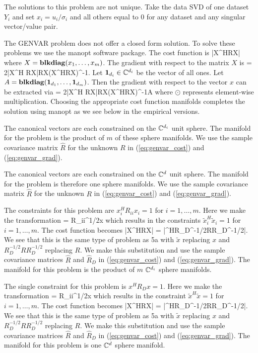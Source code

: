 The solutions to this problem are not unique. Take the data SVD of one dataset $Y_i$ and
set $x_i = u_i/\sigma_i$ and all others equal to 0 for any dataset and any singular
vector/value pair.


The GENVAR problem does not offer a closed form solution. To solve these problems we use
the manopt software package. The cost function is
\beq\label{eq:genvar_cost}
|X^HRX|
\eeq
where $X=\mathop{\bf blkdiag}(x_1,\dots,x_m)$. The gradient with respect to the matrix $X$ is
\be
{} = 2|X^H RX|RX(X^HRX)^{-1}.
\ee
Let $\mathbf 1_{d_i}\in\mathbb{C}^{d_i}$ be the vector of all ones. Let
$A=\mathop{\bf blkdiag}(\mathbf 1_{d_1},\dots,\mathbf 1_{d_m})$. Then the gradient with respect to the vector
$x$ can be extracted via
\beq\label{eq:genvar_grad}
 = 2|X^H RX|RX(X^HRX)^{-1}\odot A
\eeq
where $\odot$ represents element-wise multiplication. Choosing the appropriate cost
function manifolds completes the solution using manopt as we see below in the empirical
versions. 

The canonical vectors are each constrained on the $\mathbb{C}^{d_i}$ unit sphere. The
manifold for the problem is the product of $m$ of these sphere manifolds. We use the
sample covariance matrix $\widehat{R}$ for the unknown $R$ in (\ref{eq:genvar_cost}) and
(\ref{eq:genvar_grad}). 

The canonical vectors are each constrained on the $\mathbb{C}^{d}$ unit sphere. The
manifold for the problem is therefore one sphere manifolds. We use the
sample covariance matrix $\widehat{R}$ for the unknown $R$ in (\ref{eq:genvar_cost}) and
(\ref{eq:genvar_grad}). 

The constraints for this problem are $x_i^HR_{ii}x_i = 1$ for $i=1,\dots,m$. Here we make
the transformation
\be
{} = R_{ii}^{1/2}x
\ee
which results in the constraints $\widetilde{x}^H_i\widetilde{x}_i = 1$ for
$i=1,\dots,m$. The cost function becomes
\be
|X^HRX| = |^HR_D^{-1/2}RR_D^{-1/2}|.
\ee
We see that this is the same type of problem as 5a with $\widetilde{x}$ replacing $x$ and
$R_D^{-1/2}RR_D^{-1/2}$ replacing $R$. We make this substitution and use the sample
covariance matrices $\widehat{R}$ and $\widehat{R}_D$ in (\ref{eq:genvar_cost}) and
(\ref{eq:genvar_grad}). The manifold for this problem is the product of $m$
$\mathbb{C}^{d_i}$ sphere manifolds.

The single constraint for this problem is $x^HR_Dx = 1$. Here we make
the transformation
\be
{} = R_{ii}^{1/2}x
\ee
which results in the constraint $\widetilde{x}^H\widetilde{x} = 1$ for
$i=1,\dots,m$. The cost function becomes
\be
|X^HRX| = |^HR_D^{-1/2}RR_D^{-1/2}|.
\ee
We see that this is the same type of problem as 5a with $\widetilde{x}$ replacing $x$ and
$R_D^{-1/2}RR_D^{-1/2}$ replacing $R$. We make this substitution and use the sample
covariance matrices $\widehat{R}$ and $\widehat{R}_D$ in (\ref{eq:genvar_cost}) and
(\ref{eq:genvar_grad}). The manifold for this problem is one $\mathbb{C}^{d}$ sphere manifold.
